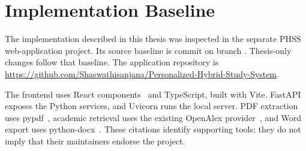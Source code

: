 \section{Implementation Baseline}
The implementation described in this thesis was inspected in the separate PHSS web-application project. Its source baseline is commit  on branch . Thesis-only changes follow that baseline. The application repository is \url{https://github.com/Shaswathisanjana/Personalized-Hybrid-Study-System}.

The frontend uses React components~\cite{reactdocs} and TypeScript, built with Vite. FastAPI~\cite{fastapidocs} exposes the Python services, and Uvicorn runs the local server. PDF extraction uses pypdf~\cite{pypdfdocs}, academic retrieval uses the existing OpenAlex provider~\cite{openalexdocs}, and Word export uses python-docx~\cite{docxdocs}. These citations identify supporting tools; they do not imply that their maintainers endorse the project.

